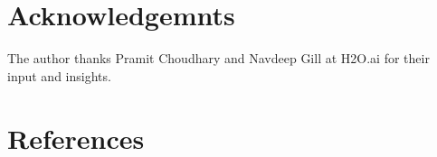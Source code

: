 \documentclass[fleqn]{article}
\begin{document}

\section*{Acknowledgemnts}

The author thanks Pramit Choudhary and Navdeep Gill at H2O.ai for their input and insights. 

\section*{References}


\end{document}
